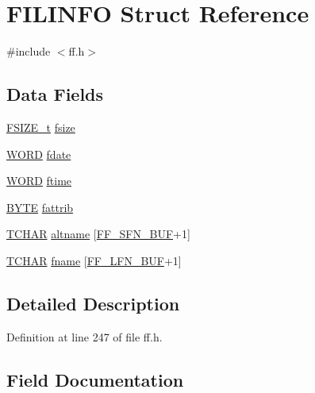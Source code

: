\hypertarget{structFILINFO}{}\section{F\+I\+L\+I\+N\+FO Struct Reference}
\label{structFILINFO}


{\ttfamily \#include $<$ff.\+h$>$}

\subsection*{Data Fields}
\begin{DoxyCompactItemize}
\item 
\hyperlink{ff_8h_a3fc0992ad7436250b6b1a0592214b7f2}{F\+S\+I\+Z\+E\+\_\+t} \hyperlink{structFILINFO_a9e5b78ed7190f73de3ebcbdfbd6d1844}{fsize}
\item 
\hyperlink{ff_8h_a197942eefa7db30960ae396d68339b97}{W\+O\+RD} \hyperlink{structFILINFO_a7c01c48a15b1b49da459924437b0bd52}{fdate}
\item 
\hyperlink{ff_8h_a197942eefa7db30960ae396d68339b97}{W\+O\+RD} \hyperlink{structFILINFO_ae0f751b79621bf7b29669f177bbe6b9a}{ftime}
\item 
\hyperlink{ff_8h_a4ae1dab0fb4b072a66584546209e7d58}{B\+Y\+TE} \hyperlink{structFILINFO_a838d542585831b085537b363f18205c0}{fattrib}
\item 
\hyperlink{ff_8h_a03bdb8ce5895c7e261aadc2529637546}{T\+C\+H\+AR} \hyperlink{structFILINFO_ab2a4c2f1ec81c11897c37bf0da4f9856}{altname} \mbox{[}\hyperlink{ffconf_8h_ac19c6abcf1fc6e2bbf204003462cfedb}{F\+F\+\_\+\+S\+F\+N\+\_\+\+B\+UF}+1\mbox{]}
\item 
\hyperlink{ff_8h_a03bdb8ce5895c7e261aadc2529637546}{T\+C\+H\+AR} \hyperlink{structFILINFO_aab1ba8d85467346a528f7569e4d15381}{fname} \mbox{[}\hyperlink{ffconf_8h_a7d29ac29d2d2db71cc7d045ea38fa927}{F\+F\+\_\+\+L\+F\+N\+\_\+\+B\+UF}+1\mbox{]}
\end{DoxyCompactItemize}


\subsection{Detailed Description}


Definition at line 247 of file ff.\+h.



\subsection{Field Documentation}
\mbox{\label{structFILINFO_ab2a4c2f1ec81c11897c37bf0da4f9856}} 
